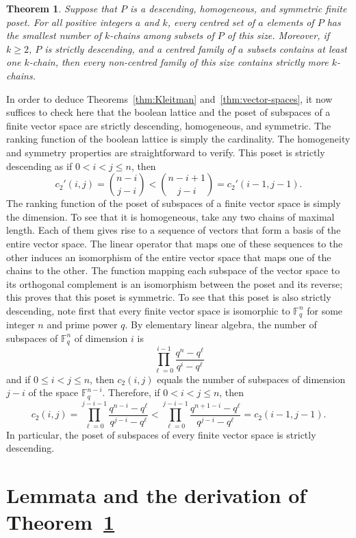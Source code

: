\documentclass[11pt,a4paper,reqno]{amsart}
\newtheorem{thm}{Theorem}
\numberwithin{claim}{thm}
\theoremstyle{definition}
\newcommand{\Fq}{\mathbb{F}_q}
\renewcommand{\le}{\leqslant}
\renewcommand{\ge}{\geqslant}
\begin{document}
\begin{thm}
  \label{thm:main}
  Suppose that $P$ is a descending, homogeneous, and symmetric finite poset. For all positive integers $a$ and $k$, every centred set of $a$ elements of $P$ has the smallest number of $k$-chains among subsets of $P$ of this size. Moreover, if $k \ge 2$, $P$ is strictly descending, and a centred family of $a$ subsets contains at least one $k$-chain, then every non-centred family of this size contains strictly more $k$-chains.
\end{thm}

In order to deduce Theorems~\ref{thm:Kleitman} and~\ref{thm:vector-spaces}, it now suffices to check here that the boolean lattice and the poset of subspaces of a finite vector space are strictly descending, homogeneous, and symmetric. The ranking function of the boolean lattice is simply the cardinality. The homogeneity and symmetry properties are straightforward to verify. This poset is strictly descending as if $0< i < j \le n$, then
\[
  c_2'(i, j) = \binom{n-i}{j-i} < \binom{n-i+1}{j-i} = c_2'(i-1, j-1).
\]
The ranking function of the poset of subspaces of a finite vector space is simply the dimension. To see that it is homogeneous, take any two chains of maximal length. Each of them gives rise to a sequence of vectors that form a basis of the entire vector space. The linear operator that maps one of these sequences to the other induces an isomorphism of the entire vector space that maps one of the chains to the other. The function mapping each subspace of the vector space to its orthogonal complement is an isomorphism between the poset and its reverse; this proves that this poset is symmetric. To see that this poset is also strictly descending, note first that every finite vector space is isomorphic to $\Fq^n$ for some integer $n$ and prime power $q$. By elementary linear algebra, the number of subspaces of $\Fq^n$ of dimension $i$ is
\[
  \prod_{\ell = 0}^{i-1} \frac{q^n-q^\ell}{q^i-q^\ell}
\]
and if $0\le i < j \le n$, then $c_2(i,j)$ equals the number of subspaces of dimension $j-i$ of the space $\Fq^{n-i}$. Therefore, if $0 < i < j \le n$, then
\[
  c_2(i,j) = \prod_{\ell = 0}^{j-i-1} \frac{q^{n-i}-q^\ell}{q^{j-i}-q^\ell} < \prod_{\ell = 0}^{j-i-1} \frac{q^{n+1-i}-q^\ell}{q^{j-i}-q^\ell} = c_2(i-1, j-1).
\]
In particular, the poset of subspaces of every finite vector space is strictly descending.

\section{Lemmata and the derivation of Theorem~\ref{thm:main}}
\label{sec:key-lemmas-proof}
\end{document}
